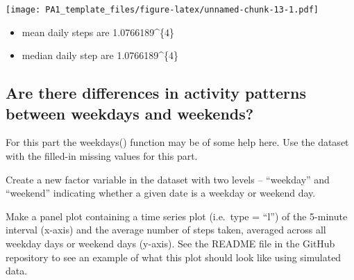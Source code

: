 \documentclass[]{article}
\newenvironment{Shaded}{\begin{snugshade}}{\end{snugshade}}
\newcommand{\CommentTok}[1]{\textcolor[rgb]{0.56,0.35,0.01}{\textit{#1}}}
\newcommand{\DataTypeTok}[1]{\textcolor[rgb]{0.13,0.29,0.53}{#1}}
\newcommand{\KeywordTok}[1]{\textcolor[rgb]{0.13,0.29,0.53}{\textbf{#1}}}
\newcommand{\NormalTok}[1]{#1}
\newcommand{\OperatorTok}[1]{\textcolor[rgb]{0.81,0.36,0.00}{\textbf{#1}}}
\newcommand{\OtherTok}[1]{\textcolor[rgb]{0.56,0.35,0.01}{#1}}
\newcommand{\StringTok}[1]{\textcolor[rgb]{0.31,0.60,0.02}{#1}}
\providecommand{\tightlist}{%
  \setlength{\itemsep}{0pt}\setlength{\parskip}{0pt}}
\begin{document}
\texttt{[image: PA1\_template\_files/figure-latex/unnamed-chunk-13-1.pdf]}

\begin{Shaded}
\end{Shaded}

\begin{itemize}
\tightlist
\item
  mean daily steps are 1.0766189\^{}\{4\}
\end{itemize}

\begin{Shaded}
\end{Shaded}

\begin{itemize}
\tightlist
\item
  median daily step are 1.0766189\^{}\{4\}
\end{itemize}

\hypertarget{are-there-differences-in-activity-patterns-between-weekdays-and-weekends}{%
\subsection{Are there differences in activity patterns between weekdays
and
weekends?}\label{are-there-differences-in-activity-patterns-between-weekdays-and-weekends}}

For this part the weekdays() function may be of some help here. Use the
dataset with the filled-in missing values for this part.

Create a new factor variable in the dataset with two levels --
``weekday'' and ``weekend'' indicating whether a given date is a weekday
or weekend day.

Make a panel plot containing a time series plot (i.e.~type = ``l'') of
the 5-minute interval (x-axis) and the average number of steps taken,
averaged across all weekday days or weekend days (y-axis). See the
README file in the GitHub repository to see an example of what this plot
should look like using simulated data.
\end{document}
